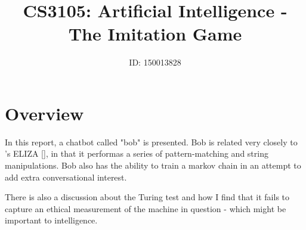 \documentclass[]{article}
\title{CS3105: Artificial Intelligence - The Imitation Game}
\author{ID: 150013828}
\begin{document}
\maketitle


\section{Overview} In this report, a chatbot called "bob" is presented. Bob is related very closely to \citeauthor{Weizenbaum}'s ELIZA [], in that it performas a series of pattern-matching and string manipulations. Bob also has the ability to train a markov chain in an attempt to add extra conversational interest.

There is also a discussion about the Turing test and how I find that it fails to capture an ethical measurement of the machine in question - which might be important to intelligence.
\end{document}

